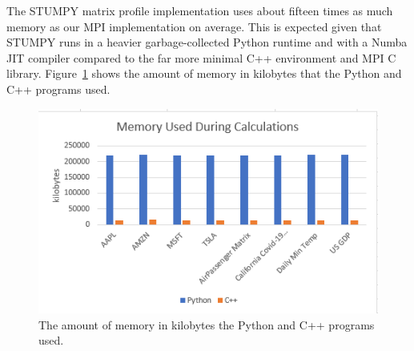 \documentclass[conference]{IEEEtran}
\begin{document}
The STUMPY matrix profile implementation uses about fifteen times as much memory as our MPI implementation on average.  This is expected given that STUMPY runs in a heavier garbage-collected Python runtime and with a Numba JIT compiler compared to the far more minimal C++ environment and MPI C library. Figure~\ref{fig:Memory_Graph} shows the amount of memory in kilobytes that the Python and C++ programs used.
\begin{figure}
\begin{center}
\includegraphics[scale=1.05]{Memory.png}
\caption{The amount of memory in kilobytes the Python and C++ programs used.}
\label{fig:Memory_Graph}
\end{center}
\end{figure}
\end{document}
